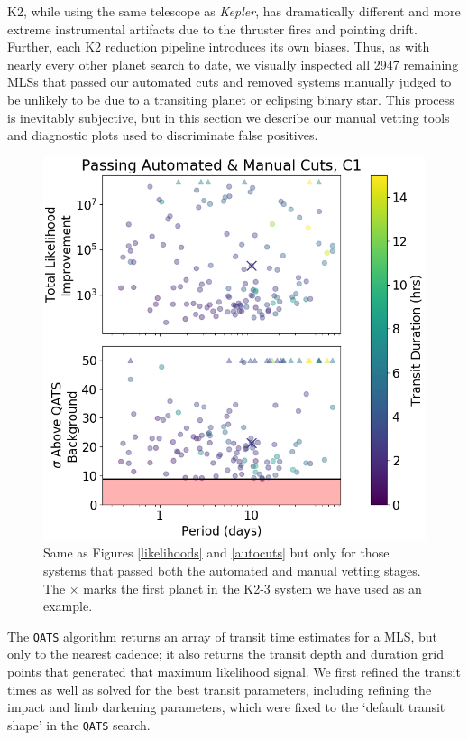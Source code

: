 \documentclass[twocolumn]{aastex62}
\newcommand{\project}[1]{\textsl{#1}}
\newcommand{\pipeline}[1]{\texttt{#1}}
\newcommand{\npassdur}{2947}
\begin{document}
K2, while using the same telescope as \project{Kepler}, has
dramatically different and more extreme instrumental artifacts due to
the thruster fires and pointing drift. Further, each K2 reduction
pipeline introduces its own biases. Thus, as with nearly every other
planet search to date, we visually inspected all \npassdur{} remaining
MLSs that passed our automated cuts and removed systems manually
judged to be unlikely to be due to a transiting planet or eclipsing
binary star. This process is inevitably subjective, but in this
section we describe our manual vetting tools and diagnostic plots used
to discriminate false positives.

\begin{figure}[tbp]
\includegraphics[width=\columnwidth]{allcuts.png}
\caption{Same as Figures \ref{likelihoods} and \ref{autocuts} but only
  for those systems that passed both the automated and manual vetting
  stages.  The $\times$ marks the first planet in the K2-3 system we
  have used as an example. \label{allcuts}}
\end{figure}

The \pipeline{QATS} algorithm returns an array of transit time
estimates for a MLS, but only to the nearest cadence; it also returns
the transit depth and duration grid points that generated that maximum
likelihood signal.  We first refined the transit times as well as
solved for the best transit parameters, including refining the impact
and limb darkening parameters, which were fixed to the `default
transit shape' in the \pipeline{QATS} search.
\end{document}
